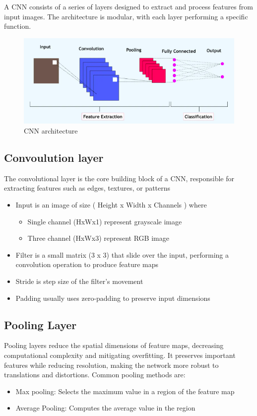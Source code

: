 \documentclass[journal]{IEEEtran} %
\begin{document}
A CNN consists of a series of layers designed to extract and process features from input images. The architecture is modular, with each layer performing a specific function.

\begin{figure}[h!]
    \centering
    \includegraphics[width=1\linewidth]{CNN_Architecture.png}
    \caption{CNN architecture}
\end{figure}

\subsection{Convoulution layer}
The convolutional layer is the core building block of a CNN, responsible for extracting features such as edges, textures, or patterns
\begin{itemize}
    \item Input is an image of size ( Height x Width x Channels ) where
    \begin{itemize}
        \item Single channel (HxWx1) represent grayscale image  
        \item Three channel (HxWx3) represent RGB image
    \end{itemize}
    \item Filter is a small matrix (3 x 3) that slide over the input, performing a convolution operation to produce feature maps
    \item Stride is step size of the filter’s movement
    \item Padding usually uses zero-padding to preserve input dimensions
\end{itemize}

\subsection{Pooling Layer}
Pooling layers reduce the spatial dimensions of feature maps, decreasing computational complexity and mitigating overfitting. It preserves important features while reducing resolution, making the network more robust to translations and distortions. Common pooling methods are:
\begin{itemize}
    \item Max pooling: Selects the maximum value in a region of the feature map
    \item Average Pooling: Computes the average value in the region
\end{itemize}
\end{document}
